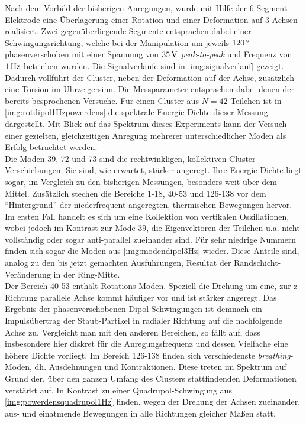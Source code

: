 \documentclass[numbers=noenddot,a4paper,notitlepage,twoside,BCOR15mm]{scrbook}
\newcommand{\degree}{^\circ}
\newcommand{\tilt}[1]{\textit{#1}}
\begin{document}
							Nach dem Vorbild der bisherigen Anregungen, wurde mit Hilfe der 6-Segment-Elektrode eine Überlagerung einer Rotation und einer Deformation auf 3 Achsen realisiert. Zwei gegenüberliegende Segmente entsprachen dabei einer Schwingungsrichtung, welche bei der Manipulation um jeweils $\unit[120]{\degree}$ phasenverschoben mit einer Spannung von $\unit[35]{V}$ \tilt{peak-to-peak} und Frequenz von $\unit[1]{Hz}$ betrieben wurden. Die Signalverläufe sind in \autoref{img:signalverlauf} gezeigt. Dadurch vollführt der Cluster, neben der Deformation auf der Achse, zusätzlich eine Torsion im Uhrzeigersinn. Die Messparameter entsprachen dabei denen der bereits besprochenen Versuche. Für einen Cluster aus $N=42$ Teilchen ist in \autoref{img:rotdipol1Hzpowerdens} die spektrale Energie-Dichte dieser Messung dargestellt. Mit Blick auf das Spektrum dieses Experiments kann der Versuch einer gezielten, gleichzeitigen Anregung mehrerer unterschiedlicher Moden als Erfolg betrachtet werden.\\
							Die Moden 39, 72 und 73 sind die rechtwinkligen, kollektiven Cluster-Verschiebungen. Sie sind, wie erwartet, stärker angeregt. Ihre Energie-Dichte liegt sogar, im Vergleich zu den bisherigen Messungen, besonders weit über dem Mittel. Zusätzlich stechen die Bereiche 1-18, 40-53 und 126-138 vor dem "`Hintergrund"' der niederfrequent angeregten, thermischen Bewegungen hervor. Im ersten Fall handelt es sich um eine Kollektion von vertikalen Oszillationen, wobei jedoch im Kontrast zur Mode 39, die Eigenvektoren der Teilchen u.a. nicht vollständig oder sogar anti-parallel zueinander sind. Für sehr niedrige Nummern finden sich sogar die Moden aus \autoref{img:modendipol3Hz} wieder. Diese Anteile sind, analog zu den bis jetzt gemachten Ausführungen, Resultat der Randschicht-Veränderung in der Ring-Mitte.\\
							Der Bereich 40-53 enthält Rotations-Moden. Speziell die Drehung um eine, zur z-Richtung parallele Achse kommt häufiger vor und ist stärker angeregt. Das Ergebnis der phasenverschobenen Dipol-Schwingungen ist demnach ein Impulsübertrag der Staub-Partikel in radialer Richtung auf die nachfolgende Achse zu. Vergleicht man mit den anderen Bereichen, so fällt auf, dass insbesondere hier diskret für die Anregungsfrequenz und dessen Vielfache eine höhere Dichte vorliegt. Im Bereich 126-138 finden sich verschiedenste \tilt{breathing}-Moden, dh. Ausdehnungen und Kontraktionen. Diese treten im Spektrum auf Grund der, über den ganzen Umfang des Clusters stattfindenden Deformationen verstärkt auf. In Kontrast zu einer Quadrupol-Schwingung aus \autoref{img:powerdensquadrupol1Hz} finden, wegen der Drehung der Achsen zueinander, aus- und einatmende Bewegungen in alle Richtungen gleicher Maßen statt.
\end{document}
